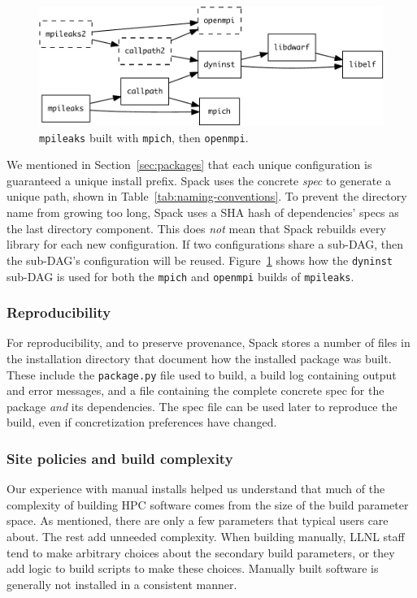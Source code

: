\begin{figure}\centering
   \includegraphics[width=\linewidth]{specs/rpaths.pdf}
   \caption{
       {\tt mpileaks} built with {\tt mpich}, then {\tt openmpi}.
       \label{fig:reuse}
   }
\end{figure}

We mentioned in Section~\ref{sec:packages} that each unique configuration is
guaranteed a unique install prefix. Spack uses the concrete {\it spec}
to generate a unique path, shown in Table~\ref{tab:naming-conventions}.
To prevent the directory name from growing too long, Spack uses a SHA hash of
dependencies' specs as the last directory component.  This
does {\it not} mean that Spack rebuilds every library for each new configuration.
If two configurations share a sub-DAG, then the sub-DAG's configuration will
be reused.  Figure~\ref{fig:reuse} shows how the {\tt dyninst} sub-DAG is used for
both the {\tt mpich} and {\tt openmpi} builds of {\tt mpileaks}.


\subsubsection{Reproducibility}


For reproducibility, and to preserve provenance, Spack stores a number of
files in the installation directory that document how the installed package was
built.  These include the {\tt package.py} file used to build, a build log
containing output and error messages, and a file containing the complete
concrete spec for the package {\it and} its dependencies. The spec file can be
used later to reproduce the build, even if concretization preferences have changed.

\subsubsection{Site policies and build complexity}

Our experience with manual installs helped us understand that much of the complexity
of building HPC software comes from the size of the build parameter space.
As mentioned, there are only a few parameters that typical users care about.
The rest add unneeded complexity.  When building manually, LLNL staff
tend to make arbitrary choices about the secondary build parameters,
or they add logic to build scripts to make these choices.
Manually built software is generally not installed in a consistent manner.


